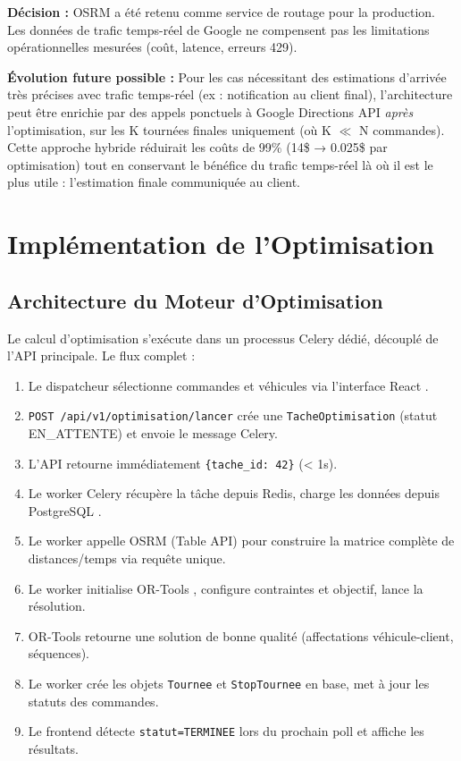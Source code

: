 \documentclass[12pt,a4paper]{report}
\begin{document}
\textbf{Décision :} OSRM a été retenu comme service de routage pour la production. Les données de trafic temps-réel de Google ne compensent pas les limitations opérationnelles mesurées (coût, latence, erreurs 429).

\textbf{Évolution future possible :} Pour les cas nécessitant des estimations d'arrivée très précises avec trafic temps-réel (ex : notification au client final), l'architecture peut être enrichie par des appels ponctuels à Google Directions API \emph{après} l'optimisation, sur les K tournées finales uniquement (où K $\ll$ N commandes). Cette approche hybride réduirait les coûts de 99\% (14\$ → 0.025\$ par optimisation) tout en conservant le bénéfice du trafic temps-réel là où il est le plus utile : l'estimation finale communiquée au client.

\section{Implémentation de l'Optimisation}

\subsection{Architecture du Moteur d'Optimisation}

Le calcul d'optimisation s'exécute dans un processus Celery \cite{celery} dédié, découplé de l'API principale. Le flux complet :

\begin{enumerate}[leftmargin=2.2em]
    \item Le dispatcheur sélectionne commandes et véhicules via l'interface React \cite{react}.
    \item \texttt{POST /api/v1/optimisation/lancer} crée une \texttt{TacheOptimisation} (statut EN\_ATTENTE) et envoie le message Celery.
    \item L'API retourne immédiatement \texttt{\{tache\_id: 42\}} (< 1s).
    \item Le worker Celery récupère la tâche depuis Redis, charge les données depuis PostgreSQL \cite{postgresql}.
    \item Le worker appelle OSRM (Table API) pour construire la matrice complète de distances/temps via requête unique.
    \item Le worker initialise OR-Tools \cite{ortools}, configure contraintes et objectif, lance la résolution.
    \item OR-Tools retourne une solution de bonne qualité (affectations véhicule-client, séquences).
    \item Le worker crée les objets \texttt{Tournee} et \texttt{StopTournee} en base, met à jour les statuts des commandes.
    \item Le frontend détecte \texttt{statut=TERMINEE} lors du prochain poll et affiche les résultats.
\end{enumerate}
\end{document}
